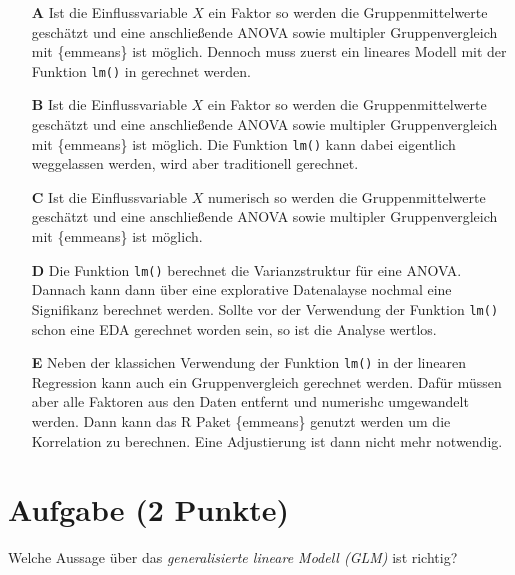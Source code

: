 \documentclass[a4paper, 9pt]{scrartcl}\usepackage[]{graphicx}\usepackage[]{xcolor}
\begin{document}
\begin{enumerate}
\item [\textbf{A} \msquare] Ist die Einflussvariable $X$ ein Faktor so werden die Gruppenmittelwerte geschätzt und eine anschließende ANOVA sowie multipler Gruppenvergleich mit \{emmeans\} ist möglich. Dennoch muss zuerst ein lineares Modell mit der Funktion \texttt{lm()} in \Rlogo gerechnet werden.
\item [\textbf{B} \msquare] Ist die Einflussvariable $X$ ein Faktor so werden die Gruppenmittelwerte geschätzt und eine anschließende ANOVA sowie multipler Gruppenvergleich mit \{emmeans\} ist möglich. Die Funktion \texttt{lm()} kann dabei eigentlich weggelassen werden, wird aber traditionell gerechnet.
\item [\textbf{C} \msquare] Ist die Einflussvariable $X$ numerisch so werden die Gruppenmittelwerte geschätzt und eine anschließende ANOVA sowie multipler Gruppenvergleich mit \{emmeans\} ist möglich.
\item [\textbf{D} \msquare] Die Funktion \texttt{lm()} berechnet die Varianzstruktur für eine ANOVA. Dannach kann dann über eine explorative Datenalayse nochmal eine Signifikanz berechnet werden. Sollte vor der Verwendung der Funktion \texttt{lm()} schon eine EDA gerechnet worden sein, so ist die Analyse wertlos.
\item [\textbf{E} \msquare] Neben der klassichen Verwendung der Funktion \texttt{lm()} in der linearen Regression kann auch ein Gruppenvergleich gerechnet werden. Dafür müssen aber alle Faktoren aus den Daten entfernt und numerishc umgewandelt werden. Dann kann das R Paket \{emmeans\} genutzt werden um die Korrelation zu berechnen. Eine Adjustierung ist dann nicht mehr notwendig.
\end{enumerate}

\section{Aufgabe \hfill (2 Punkte)}



Welche Aussage über das \textit{generalisierte lineare Modell (GLM)} ist richtig?
\end{document}

